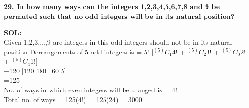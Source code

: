\documentclass[8pt,a4paper]{article}
\begin{document}
\section{}

\textbf{29. In how many ways can the integers 1,2,3,4,5,6,7,8 and 9 be permuted such that no odd
integers will be in its natural position?}

\textbf{SOL:}\\

Given 1,2,3,...,9 are integers
in this odd integers should not be in its natural position
   Derrangements of 5 odd integers is
                       = 5!-[$^(5)C_1${4!} + $^(5)C_2${3!} + $^(5)C_3${2!} + $^(5)C_4${1!}]\\
                       =120-[120-180+60-5]\\
                       =125\\
No. of ways in which even integers will be aranged is = 4!\\
    Total no. of ways = 125(4!)
                      = 125(24)
                      = 3000\\
\end{document}
